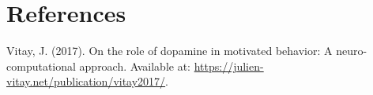 \documentclass[
  a4paper,
]{article}
\newlength{\cslhangindent}
\newlength{\cslentryspacingunit} %
\newenvironment{CSLReferences}[2] %
 {%
  \setlength{\parindent}{0pt}
  \ifodd #1
  \let\oldpar\par
  \def\par{\hangindent=\cslhangindent\oldpar}
  \fi
  \setlength{\parskip}{#2\cslentryspacingunit}
 }%
 {}
\begin{document}
\hypertarget{references}{%
\section*{References}\label{references}}

\hypertarget{refs}{}
\begin{CSLReferences}{1}{0}
\leavevmode{}%
Vitay, J. (2017). On the role of dopamine in motivated behavior: A
neuro-computational approach. Available at:
\url{https://julien-vitay.net/publication/vitay2017/}.

\end{CSLReferences}
\end{document}
